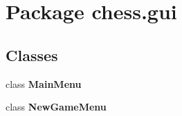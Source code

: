 \section{Package chess.\+gui}
\label{namespacechess_1_1gui}
\subsection*{Classes}
\begin{DoxyCompactItemize}
\item 
class {\bf Main\+Menu}
\item 
class {\bf New\+Game\+Menu}
\end{DoxyCompactItemize}
